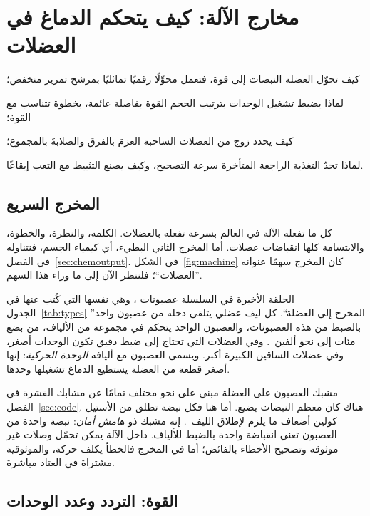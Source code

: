 \chapter{مخارج الآلة: كيف يتحكم الدماغ في العضلات}
\label{sec:muscles}
\begin{chaptergoals}
\item كيف تحوّل العضلة النبضات إلى قوة، فتعمل محوِّلًا رقميًا تماثليًا بمرشح تمرير منخفض؛
\item لماذا يضبط تشغيل الوحدات بترتيب الحجم القوة بفاصلة عائمة، بخطوة تتناسب مع القوة؛
\item كيف يحدد زوج من العضلات الساحبة العزمَ بالفرق والصلابةَ بالمجموع؛
\item لماذا تحدّ التغذية الراجعة المتأخرة سرعة التصحيح، وكيف يصنع التثبيط مع التعب إيقاعًا.
\end{chaptergoals}

\section{المخرج السريع}

كل ما تفعله الآلة في العالم بسرعة تفعله بالعضلات. الكلمة، والنظرة، والخطوة، والابتسامة كلها انقباضات عضلات. أما المخرج الثاني البطيء، أي كيمياء الجسم، فنتناوله في الفصل~\ref{sec:chemoutput}. في الشكل~\ref{fig:machine} كان المخرج سهمًا عنوانه ”العضلات“؛ فلننظر الآن إلى ما وراء هذا السهم.

الحلقة الأخيرة في السلسلة عصبونات ، وهي نفسها التي كُتب عنها في الجدول~\ref{tab:types} ”المخرج إلى العضلة“. كل ليف عضلي يتلقى دخله من عصبون واحد بالضبط من هذه العصبونات، والعصبون الواحد يتحكم في مجموعة من الألياف، من بضع مئات إلى نحو ألفين~\cite{Feinstein1955mu}. وفي العضلات التي تحتاج إلى ضبط دقيق تكون الوحدات أصغر، وفي عضلات الساقين الكبيرة أكبر. ويسمى العصبون مع أليافه \emph{الوحدة الحركية}: إنها أصغر قطعة من العضلة يستطيع الدماغ تشغيلها وحدها.

مشبك العصبون على العضلة مبني على نحو مختلف تمامًا عن مشابك القشرة في الفصل~\ref{sec:code}. هناك كان معظم النبضات يضيع. أما هنا فكل نبضة تطلق من الأستيل كولين أضعاف ما يلزم لإطلاق الليف~\cite{WoodSlater2001}. إنه مشبك ذو \emph{هامش أمان}: نبضة واحدة من العصبون تعني انقباضة واحدة بالضبط للألياف. داخل الآلة يمكن تحمّل وصلات غير موثوقة وتصحيح الأخطاء بالفائض؛ أما في المخرج فالخطأ يكلف حركة، والموثوقية مشتراة في العتاد مباشرة.

\section{القوة: التردد وعدد الوحدات}

